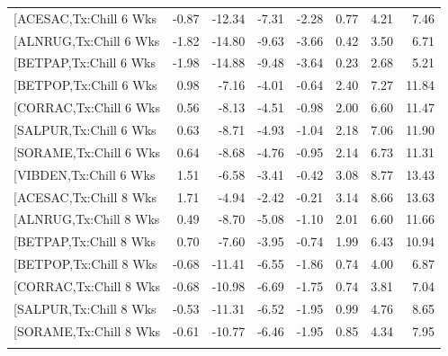 \documentclass{article}\usepackage[]{graphicx}\usepackage[]{color}
\begin{document}
\begin{longtable}{lrrrrrrr}
  [ACESAC,Tx:Chill 6 Wks & -0.87 & -12.34 & -7.31 & -2.28 & 0.77 & 4.21 & 7.46 \\ 
  [ALNRUG,Tx:Chill 6 Wks & -1.82 & -14.80 & -9.63 & -3.66 & 0.42 & 3.50 & 6.71 \\ 
  [BETPAP,Tx:Chill 6 Wks & -1.98 & -14.88 & -9.48 & -3.64 & 0.23 & 2.68 & 5.21 \\ 
  [BETPOP,Tx:Chill 6 Wks & 0.98 & -7.16 & -4.01 & -0.64 & 2.40 & 7.27 & 11.84 \\ 
  [CORRAC,Tx:Chill 6 Wks & 0.56 & -8.13 & -4.51 & -0.98 & 2.00 & 6.60 & 11.47 \\ 
  [SALPUR,Tx:Chill 6 Wks & 0.63 & -8.71 & -4.93 & -1.04 & 2.18 & 7.06 & 11.90 \\ 
  [SORAME,Tx:Chill 6 Wks & 0.64 & -8.68 & -4.76 & -0.95 & 2.14 & 6.73 & 11.31 \\ 
  [VIBDEN,Tx:Chill 6 Wks & 1.51 & -6.58 & -3.41 & -0.42 & 3.08 & 8.77 & 13.43 \\ 
  [ACESAC,Tx:Chill 8 Wks & 1.71 & -4.94 & -2.42 & -0.21 & 3.14 & 8.66 & 13.63 \\ 
  [ALNRUG,Tx:Chill 8 Wks & 0.49 & -8.70 & -5.08 & -1.10 & 2.01 & 6.60 & 11.66 \\ 
  [BETPAP,Tx:Chill 8 Wks & 0.70 & -7.60 & -3.95 & -0.74 & 1.99 & 6.43 & 10.94 \\ 
  [BETPOP,Tx:Chill 8 Wks & -0.68 & -11.41 & -6.55 & -1.86 & 0.74 & 4.00 & 6.87 \\ 
  [CORRAC,Tx:Chill 8 Wks & -0.68 & -10.98 & -6.69 & -1.75 & 0.74 & 3.81 & 7.04 \\ 
  [SALPUR,Tx:Chill 8 Wks & -0.53 & -11.31 & -6.52 & -1.95 & 0.99 & 4.76 & 8.65 \\ 
  [SORAME,Tx:Chill 8 Wks & -0.61 & -10.77 & -6.46 & -1.95 & 0.85 & 4.34 & 7.95 \\ 
   \hline
\hline
\label{tab:suppmodtotbio}
\end{longtable}
\end{document}
